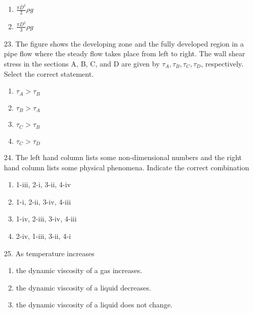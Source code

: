 \documentclass[journal]{IEEEtran}
\begin{document}
\begin{enumerate}
\begin{enumerate}[label = (\Alph*)]
        \item $\frac{\pi D^2}{2}\rho g$
        \item $\frac{\pi D^2}{3}\rho g$
    \end{enumerate} 
    \item[23.] The figure shows the developing zone and the fully developed region in a pipe
    flow where the steady flow takes place from left to right. The wall shear stress in
    the sections A, B, C, and D are given by $\tau_A,\tau_B,\tau_C,\tau_D$, respectively. Select the
    correct statement. 
    \begin{figure}[!ht]
        \centering
        \caption{}
    \end{figure}
    \begin{enumerate}[label = (\Alph*)]
        \item $\tau_A > \tau_B$
        \item $\tau_B > \tau_A$
        \item $\tau_C > \tau_B$
        \item $\tau_C > \tau_D$
    \end{enumerate}
    \item[24.] The left hand column lists some non-dimensional numbers and the right hand column lists some physical phenomena. Indicate the correct combination 
    \begin{table}
        \centering
        \caption{}
    \end{table}
    \begin{enumerate}[label = (\Alph*)]
        \item 1-iii, 2-i, 3-ii, 4-iv
        \item 1-i, 2-ii, 3-iv, 4-iii
        \item 1-iv, 2-iii, 3-iv, 4-iii
        \item 2-iv, 1-iii, 3-ii, 4-i
    \end{enumerate}
    \item[25.] As temperature increases
    \begin{enumerate}[label = (\Alph*)]
        \item the dynamic viscosity of a gas increases. 
        \item the dynamic viscosity of a liquid decreases.
        \item the dynamic viscosity of a liquid does not change.

\end{enumerate}
\end{enumerate}
\end{document}
